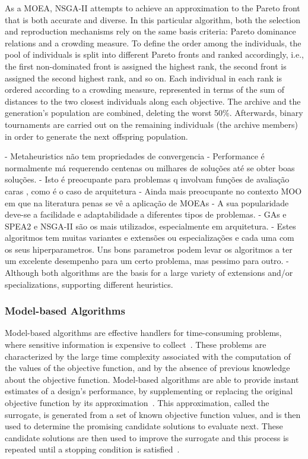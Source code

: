 	As a \ac{MOEA}, \ac{NSGA-II} attempts to achieve an approximation to the Pareto front that is both accurate and diverse. In this particular algorithm, both the selection and reproduction mechanisms rely on the same basis criteria: Pareto dominance relations and a crowding measure. To define the order among the individuals, the pool of individuals is split into different Pareto fronts and ranked accordingly, i.e., the first non-dominated front is assigned the highest rank, the second front is assigned the second highest rank, and so on. Each individual in each rank is ordered according to a crowding measure, represented in terms of the sum of distances to the two closest individuals along each objective. The archive and the generation's population are combined, deleting the worst 50\%. Afterwards, binary tournaments are carried out on the remaining individuals (the archive members) in order to generate the next offspring population.	
	
	- Metaheuristics não tem propriedades de convergencia 
	- Performance é normalmente má requerendo centenas ou milhares de soluções até se obter boas soluções. 
	- Isto é preocupante para problemas q involvam funções de avaliação caras , como é o caso de arquitetura
	- Ainda mais preocupante no contexto MOO em que na literatura penas se vê a aplicação de MOEAs
	- A sua popularidade deve-se a facilidade e adaptabilidade a diferentes tipos de problemas. 
	- GAs e SPEA2 e NSGA-II são os mais utilizados, especialmente em arquitetura. 
	- Estes algoritmos tem muitas variantes e extensões ou especializações e cada uma com os seus hiperparametros. Uns bons parametros podem levar os algoritmos a ter um excelente desempenho para um certo problema, mas pessimo para outro.
	- Although both algorithms are the basis for a large variety of extensions and/or specializations, supporting different heuristics.
	
	\subsubsection{Model-based Algorithms}
	\label{ssec:model-based}
	Model-based algorithms are effective handlers for time-consuming problems, where sensitive information is expensive to collect~\cite{Forrester2009SBO, Wortmann2016BBO}. These problems are characterized by the large time complexity associated with the computation of the values of the objective function, and by the absence of previous knowledge about the objective function. Model-based algorithms are able to provide instant estimates of a design’s performance, by supplementing or replacing the original objective function by its approximation~\cite{Wortmann2016BBO}. This approximation, called the surrogate, is generated from a set of known objective function values, and is then used to determine the promising candidate solutions to evaluate next. These candidate solutions are then used to improve the surrogate and this process is repeated until a stopping condition is satisfied~\cite{Koziel2011}.
	
